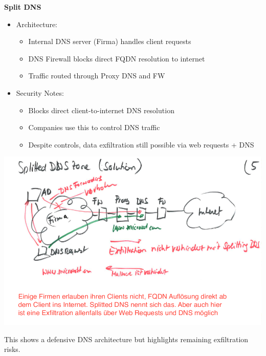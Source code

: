 \textbf{Split DNS}
\begin{itemize}
	\item Architecture:
  \begin{itemize}
    \tightlist
		\item Internal DNS server (Firma) handles client requests
		\item DNS Firewall blocks direct FQDN resolution to internet
		\item Traffic routed through Proxy DNS and FW
  \end{itemize}

	\item Security Notes:
  \begin{itemize}
    \tightlist
		\item Blocks direct client-to-internet DNS resolution
		\item Companies use this to control DNS traffic
		\item Despite controls, data exfiltration still possible via web requests + DNS
  \end{itemize}
\end{itemize}
\begin{center}
\includegraphics[width=\textwidth]{resources/03-split-dns.png}
\end{center}

This shows a defensive DNS architecture but highlights remaining exfiltration risks.

